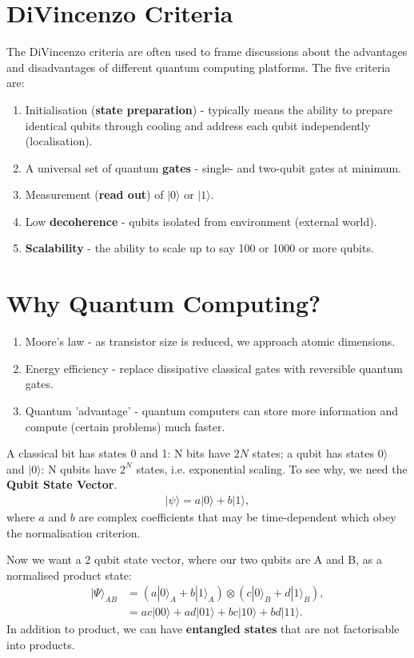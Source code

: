 \documentclass[a4paper, 11pt, normalem]{report}
\begin{document}
\section{DiVincenzo Criteria}
The DiVincenzo criteria are often used to frame discussions about the advantages and disadvantages of different quantum computing platforms.
The five criteria are:
\begin{enumerate}
    \item Initialisation (\textbf{state preparation}) - typically means the ability to prepare identical qubits through cooling and address each qubit independently (localisation).
    \item A universal set of quantum \textbf{gates} - single- and two-qubit gates at minimum.
    \item Measurement (\textbf{read out}) of $|0\rangle$ or $|1\rangle$.
    \item Low \textbf{decoherence} - qubits isolated from environment (external world).
    \item \textbf{Scalability} - the ability to scale up to say 100 or 1000 or more qubits.
\end{enumerate}

\section{Why Quantum Computing?}
\begin{enumerate}
    \item Moore's law - as transistor size is reduced, we approach atomic dimensions.
    \item Energy efficiency - replace dissipative classical gates with reversible quantum gates.
    \item Quantum 'advantage' - quantum computers can store more information and compute (certain problems) much faster.
\end{enumerate}
A classical bit has states 0 and 1: N bits have $2N$ states; a qubit has states $0\rangle$ and $|0\rangle$: N qubits have $2^N$ states, i.e. exponential scaling.
To see why, we need the \textbf{Qubit State Vector}.
\begin{align}
    |\psi\rangle = a|0\rangle + b|1\rangle,
\end{align}
where $a$ and $b$ are complex coefficients that may be time-dependent which obey the normalisation criterion.

Now we want a 2 qubit state vector, where our two qubits are A and B, as a normalised product state:
\begin{align}
    |\Psi\rangle_{AB} &= (a|0\rangle_A + b|1\rangle_A)\otimes(c|0\rangle_B+d|1\rangle_B), \\
                      &= ac|00\rangle + ad|01\rangle + bc|10\rangle + bd|11\rangle.
\end{align}
In addition to product, we can have \textbf{entangled states} that are not factorisable into products.
\end{document}
